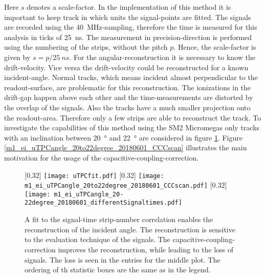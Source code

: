 \documentclass[
twoside,            %
BCOR1.4cm,          %
10pt,               %
headings=normal,    %
headsepline,        %
clearplainpage,		%
final,              %
div=14,
open=right,
bibliography=toc
]{scrreprt}
\begin{document}
Here $s$ denotes a scale-factor.
In the implementation of this method it is important to keep track in which units the signal-points are fitted.
The signals are recorded using the \SI{40}{MHz}-sampling, therefore the time is measured for this analysis in ticks of \SI{25}{ns}.
The measurement in precision-direction is performed using the numbering of the strips, without the pitch $p$.
Hence, the scale-factor is given by $s = p / \SI{25}{ns}$.
For the angular-reconstruction it is necessary to know the drift-velocity.
Vice versa the drift-velocity could be reconstructed for a known incident-angle.
Normal tracks, which means incident almost perpendicular to the readout-surface, are problematic for this reconstruction.
The ionizations in the drift-gap happen above each other and the time-measurements are distorted by the overlap of the signals.
Also the tracks have a much smaller projection onto the readout-area.
Therefore only a few strips are able to reconstruct the track.
To investigate the capabilities of this method using the SM2 Micromegas only tracks with an inclination between \SI{20}{\degree} and \SI{22}{\degree} are considered in figure \ref{uTPClargeAngle}.
Figure \ref{m1_ei_uTPCangle_20to22degree_20180601_CCCscan} illustrates the main motivation for the usage of the capacitive-coupling-correction.

\begin{figure}[!h]
	\centering
	[0.32\textwidth]
	{\texttt{[image: uTPCfit.pdf]}}
	\hfill
	[0.32\textwidth]
	{\texttt{[image: m1\_ei\_uTPCangle\_20to22degree\_20180601\_CCCscan.pdf]}}
	\hfill
	[0.32\textwidth]
	{\texttt{[image: m1\_ei\_uTPCangle\_20-22degree\_20180601\_differentSignaltimes.pdf]}}
	\vspace{-2mm}
	\caption{
		A fit to the signal-time strip-number correlation enables the reconstruction of the incident angle.
		The reconstruction is sensitive to the evaluation technique of the signals.
		The capacitive-coupling-correction improves the reconstruction, while leading to the loss of signals.
		The loss is seen in the entries for the middle plot.
		The ordering of th statistic boxes are the same as in the legend.
	}
	\label{uTPClargeAngle}
\end{figure}
\end{document}

